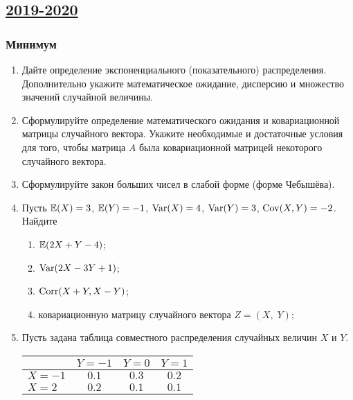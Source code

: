 \begin{enumerate}
  \end{enumerate}


\subsection[2019-2020]{\hyperref[sec:sol_kr_02_2019_2020]{2019-2020}}
\label{sec:kr_02_2019_2020}

\subsubsection*{Минимум}


\begin{enumerate}


  \item Дайте определение экспоненциального (показательного) распределения. 
  Дополнительно укажите математическое ожидание, дисперсию и множество значений случайной величины.
  
  \item Сформулируйте определение математического ожидания и ковариационной матрицы случайного
  вектора. Укажите необходимые и достаточные условия для того, 
  чтобы матрица $A$ была ковариационной матрицей некоторого случайного вектора.
  
  \item Сформулируйте закон больших чисел в слабой форме (форме Чебышёва).
  
  
  \item Пусть $\operatorname{\mathbb{E}}(X)=3$, $\operatorname{\mathbb{E}}(Y)=-1$, $\operatorname{Var}(X) = 4$, $\operatorname{Var}(Y) = 3$, $\operatorname{Cov}(X,Y) = -2$. Найдите
  \begin{enumerate}
  \item $\operatorname{\mathbb{E}}(2X + Y - 4)$;
  \item $\operatorname{Var}(2X - 3Y +1)$;
  \item $\operatorname{Corr}(X + Y, X - Y)$;
  \item ковариационную матрицу случайного вектора $Z = (X, \; Y)$;
  \end{enumerate}
  
  
  
  \item Пусть задана таблица совместного распределения случайных величин $X$ и $Y$.
  
  \begin{center}
  \begin{tabular}{lccc}
  \toprule
                         & $Y=-1$  & $Y=0$   & $Y=1$   \\ \midrule
  $X=-1$                 & $0.1$ & $0.3$ & $0.2$ \\
   $X=2$                 & $0.2$ & $0.1$ & $0.1$ \\ \bottomrule
  \end{tabular}
  \end{center}
  

\end{enumerate}
